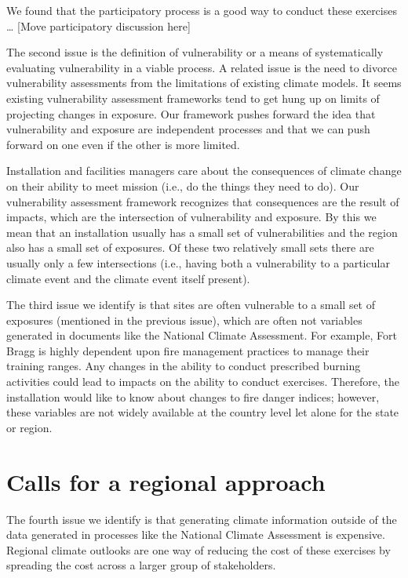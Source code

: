 \documentclass[10pt]{amsart}
\begin{document}
We found that the participatory process is a good way to conduct these exercises \ldots
[Move participatory discussion here]

The second issue is the definition of vulnerability or a means of systematically evaluating vulnerability in a viable process.
A related issue is the need to divorce vulnerability assessments from the limitations of existing climate models.
It seems existing vulnerability assessment frameworks tend to get hung up on limits of projecting changes in exposure.
Our framework pushes forward the idea that vulnerability and exposure are independent processes and that we can push forward on one even if the other is more limited. 

Installation and facilities managers care about the consequences of climate change on their ability to meet mission (i.e., do the things they need to do).
Our vulnerability assessment framework recognizes that consequences are the result of impacts, which are the intersection of vulnerability and exposure.
By this we mean that an installation usually has a small set of vulnerabilities and the region also has a small set of exposures. 
Of these two relatively small sets there are usually only a few intersections (i.e., having both a vulnerability to a particular climate event and the climate event itself present).

The third issue we identify is that sites are often vulnerable to a small set of exposures (mentioned in the previous issue), which are often not variables generated in documents like the National Climate Assessment.
For example, Fort Bragg is highly dependent upon fire management practices to manage their training ranges. 
Any changes in the ability to conduct prescribed burning activities could lead to impacts on the ability to conduct exercises.
Therefore, the installation would like to know about changes to fire danger indices; however, these variables are not widely available at the country level let alone for the state or region.

\section{Calls for a regional approach}
The fourth issue we identify is that generating climate information outside of the data generated in processes like the National Climate Assessment is expensive.
Regional climate outlooks are one way of reducing the cost of these exercises by spreading the cost across a larger group of stakeholders.
\end{document}
